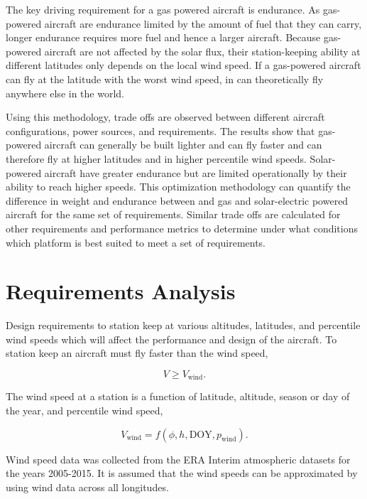 \documentclass[]{aiaa-tc}%
\begin{document}
The key driving requirement for a gas powered aircraft is endurance.  
As gas-powered aircraft are endurance limited by the amount of fuel that they can carry, longer endurance requires more fuel and hence a larger aircraft.  
Because gas-powered aircraft are not affected by the solar flux, their station-keeping ability at different latitudes only depends on the local wind speed. 
If a gas-powered aircraft can fly at the latitude with the worst wind speed, in can theoretically fly anywhere else in the world.  

Using this methodology, trade offs are observed between different aircraft configurations, power sources, and requirements.  
The results show that gas-powered aircraft can generally be built lighter and can fly faster and can therefore fly at higher latitudes and in higher percentile wind speeds.  
Solar-powered aircraft have greater endurance but are limited operationally by their ability to reach higher speeds.  
This optimization methodology can quantify the difference in weight and endurance between and gas and solar-electric powered aircraft for the same set of requirements. 
Similar trade offs are calculated for other requirements and performance metrics to determine under what conditions which platform is best suited to meet a set of requirements.

\section{Requirements Analysis}

Design requirements to station keep at various altitudes, latitudes, and percentile wind speeds which will affect the performance and design of the aircraft.\cite{zephyr} 
To station keep an aircraft must fly faster than the wind speed,

\begin{equation}
    \label{e:availreq}
    V \geq V_{\text{wind}}.
\end{equation}

The wind speed at a station is a function of latitude, altitude, season or day of the year, and percentile wind speed,

\begin{equation}
    \label{e:windspeed}
    V_{\text{wind}} = f(\phi, h, \text{DOY}, p_{\text{wind}}).
    \end{equation}

Wind speed data was collected from the ERA Interim atmospheric datasets for the years 2005-2015.\cite{wind} 
It is assumed that the wind speeds can be approximated by using wind data across all longitudes. 
\end{document}
